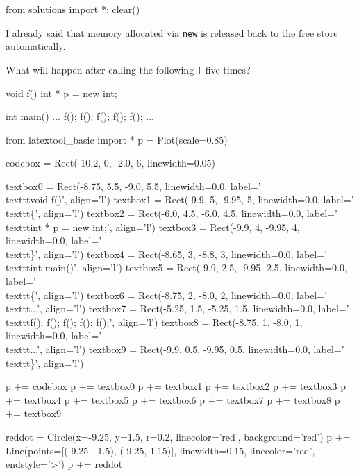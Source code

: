 \begin{python0}
from solutions import *; clear()
\end{python0}

I already said that memory allocated via \texttt{new} is  released back to the free store automatically. 

What will happen after calling the following \texttt{f} five times?

\begin{consolethree}[escapeinside=||]
void f()
{
    int * p = new int;
}

int main()
{
    ...
    f(); f(); f(); f(); f();
    ...
}
\end{consolethree}
\begin{python}
from latextool_basic import *
p = Plot(scale=0.85)

codebox = Rect(-10.2, 0, -2.0, 6, linewidth=0.05)

textbox0 = Rect(-8.75, 5.5, -9.0, 5.5, linewidth=0.0, label='\\texttt{void f()}', align='l')
textbox1 = Rect(-9.9, 5, -9.95, 5, linewidth=0.0, label='\\texttt{\{}', align='l')
textbox2 = Rect(-6.0, 4.5, -6.0, 4.5, linewidth=0.0, label='\\texttt{int * p = new int;}', align='l')
textbox3 = Rect(-9.9, 4, -9.95, 4, linewidth=0.0, label='\\texttt{\}}', align='l')
textbox4 = Rect(-8.65, 3, -8.8, 3, linewidth=0.0, label='\\texttt{int main()}', align='l')
textbox5 = Rect(-9.9, 2.5, -9.95, 2.5, linewidth=0.0, label='\\texttt{\{}', align='l')
textbox6 = Rect(-8.75, 2, -8.0, 2, linewidth=0.0, label='\\texttt{...}', align='l')
textbox7 = Rect(-5.25, 1.5, -5.25, 1.5, linewidth=0.0, label='\\texttt{f(); f(); f(); f(); f();}', align='l')
textbox8 = Rect(-8.75, 1, -8.0, 1, linewidth=0.0, label='\\texttt{...}', align='l')
textbox9 = Rect(-9.9, 0.5, -9.95, 0.5, linewidth=0.0, label='\\texttt{\}}', align='l')

p += codebox
p += textbox0
p += textbox1
p += textbox2
p += textbox3
p += textbox4
p += textbox5
p += textbox6
p += textbox7
p += textbox8
p += textbox9

reddot = Circle(x=-9.25, y=1.5, r=0.2, linecolor='red', background='red')
p += Line(points=[(-9.25, -1.5), (-9.25, 1.15)], linewidth=0.15, linecolor='red', endstyle='>')
p += reddot


\end{python}
